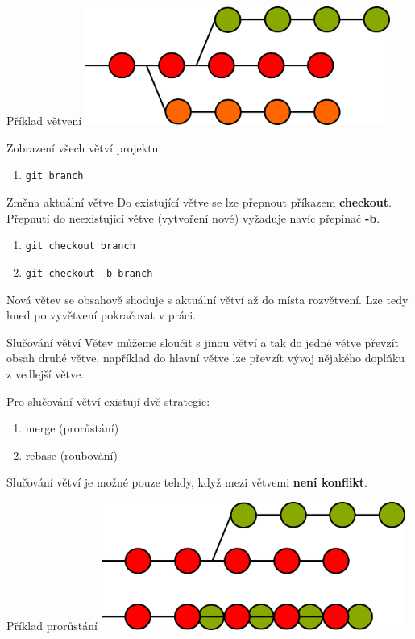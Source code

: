 \documentclass[14pt]{beamer}
\renewcommand{\texttt}[1]{{{\tt\color{blue}#1}}}
\begin{document}
	\begin{frame}{Příklad větvení}
		\includegraphics[width=10cm]{images/branches}
	\end{frame}

	\begin{frame}{Zobrazení všech větví projektu}
		\begin{enumerate}
			\item \texttt{git branch}
		\end{enumerate}
	\end{frame}

	\begin{frame}{Změna aktuální větve}
		Do existující větve se lze přepnout příkazem \textbf{checkout}. Přepnutí do neexistující větve (vytvoření nové) vyžaduje navíc přepínač \textbf{-b}.
	\begin{enumerate}
		\item \texttt{git checkout branch}
		\item \texttt{git checkout -b branch}
	\end{enumerate}
	Nová větev se obsahově shoduje s aktuální větví až do místa rozvětvení. Lze tedy hned po vyvětvení pokračovat v práci.
	\end{frame}

	\begin{frame}{Slučování větví}
	Větev můžeme sloučit s jinou větví a tak do jedné větve převzít obsah druhé větve, například do hlavní větve lze převzít vývoj nějakého doplňku z vedlejší větve. 
	
	Pro slučování větví existují dvě strategie:
	\begin{enumerate}
		\item merge (prorůstání)
		\item rebase (roubování)
	\end{enumerate}
	Slučování větví je možné pouze tehdy, když mezi větvemi \textbf{není konflikt}.

	\end{frame}

	\begin{frame}{Příklad prorůstání}
	\includegraphics[width=10cm]{images/merge}
	\end{frame}
\end{document}
